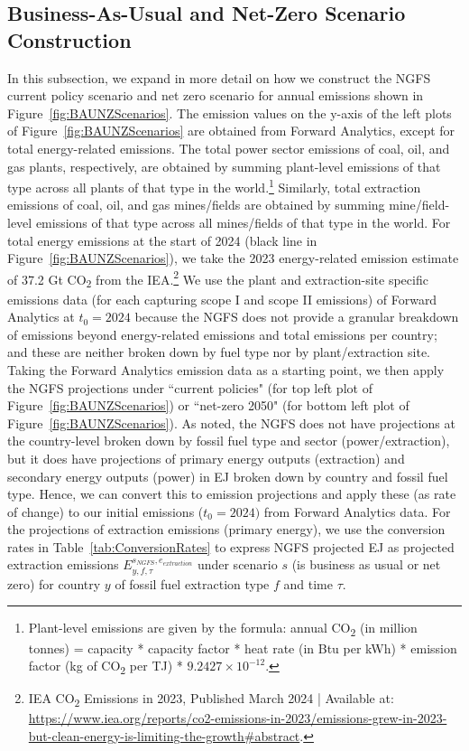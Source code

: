 \documentclass[11pt,a4paper,table,xcdraw]{article}
\begin{document}
\subsection{Business-As-Usual and Net-Zero Scenario Construction}\label{ap:DataScenarioConstruction}

In this subsection, we expand in more detail on how we construct the NGFS current policy scenario and net zero scenario for annual emissions shown in Figure~\ref{fig:BAUNZScenarios}. The emission values on the y-axis of the left plots of Figure~\ref{fig:BAUNZScenarios} are obtained from Forward Analytics, except for total energy-related emissions. The total power sector emissions of coal, oil, and gas plants, respectively, are obtained by summing plant-level emissions of that type across all plants of that type in the world.\footnote{Plant-level emissions are given by the formula: annual CO\textsubscript{2} (in million tonnes) = capacity * capacity factor * heat rate (in Btu per kWh) * emission factor (kg of CO\textsubscript{2} per TJ) * $9.2427 \times 10^{-12}$.} Similarly, total extraction emissions of coal, oil, and gas mines/fields are obtained by summing mine/field-level emissions of that type across all mines/fields of that type in the world. For total energy emissions at the start of 2024 (black line in Figure~\ref{fig:BAUNZScenarios}), we take the 2023 energy-related emission estimate of 37.2 Gt CO\textsubscript{2} from the IEA.\footnote{IEA CO\textsubscript{2} Emissions in 2023, Published March 2024 | Available at: \url{https://www.iea.org/reports/co2-emissions-in-2023/emissions-grew-in-2023-but-clean-energy-is-limiting-the-growth\#abstract}.} We use the plant and extraction-site specific emissions data (for each capturing scope I and scope II emissions) of Forward Analytics at $t_0=2024$ because the NGFS does not provide a granular breakdown of emissions beyond energy-related emissions and total emissions per country; and these are neither broken down by fuel type nor by plant/extraction site.\newline
\indent Taking the Forward Analytics emission data as a starting point, we then apply the NGFS projections under ``current policies" (for top left plot of Figure~\ref{fig:BAUNZScenarios}) or ``net-zero 2050" (for bottom left plot of Figure~\ref{fig:BAUNZScenarios}). As noted, the NGFS does not have projections at the country-level broken down by fossil fuel type and sector (power/extraction), but it does have projections of primary energy outputs (extraction) and secondary energy outputs (power) in EJ broken down by country and fossil fuel type. Hence, we can convert this to emission projections and apply these (as rate of change) to our initial emissions ($t_0=2024)$ from Forward Analytics data.\newline
\indent For the projections of extraction emissions (primary energy), we use the conversion rates in Table~\ref{tab:ConversionRates} to express NGFS projected EJ as projected extraction emissions $E^{s_{NGFS},e_{extraction}}_{y,f,\tau}$ under scenario $s$ (is business as usual or net zero) for country $y$ of fossil fuel extraction type $f$ and time $\tau$.
\end{document}
